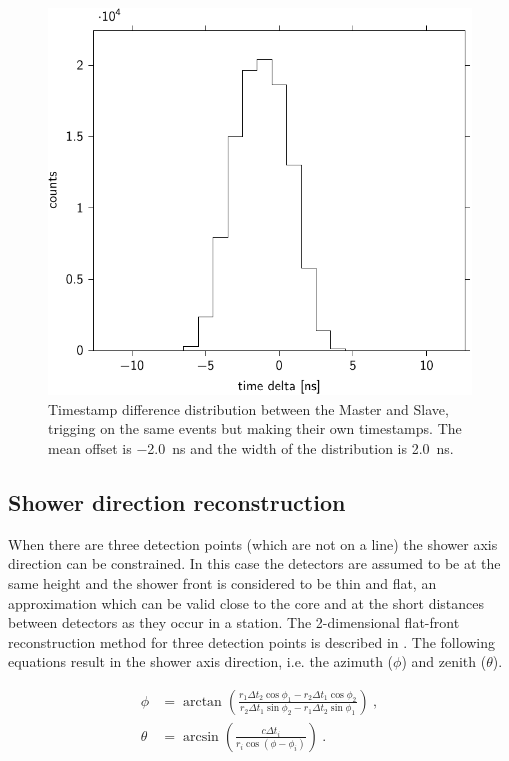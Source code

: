 \begin{figure}
    \centering
    \includegraphics{plots/station/time_delta_501}
    \caption{Timestamp difference distribution between the Master and Slave, trigging on the same events but making their own timestamps. The mean offset is \SI{-2.0}{\ns} and the width of the distribution is \SI{2.0}{\ns}.}
    \label{fig:time_delta_501}
\end{figure}


\subsection{Shower direction reconstruction}

When there are three detection points (which are not on a line) the shower axis direction can be constrained. In this case the detectors are assumed to be at the same height and the shower front is considered to be thin and flat, an approximation which can be valid close to the core and at the short distances between detectors as they occur in a station. The 2-dimensional flat-front reconstruction method for three detection points is described in \cite{fokkema2012hisparc}. The following equations result in the shower axis direction, i.e. the azimuth ($\phi$) and zenith ($\theta$).

\begin{equation}
    \label{eq:direction-2dflat}
    \begin{split}
        \phi &= \arctan \left(\frac{r_1 \Delta t_2 \cos \phi_1 - r_2 \Delta t_1 \cos \phi_2}{r_2 \Delta t_1 \sin \phi_2 - r_1 \Delta t_2 \sin \phi_1} \right) \ , \\
        \theta &= \arcsin \left(\frac{c \Delta t_i}{r_i \cos(\phi - \phi_i)} \right) \ .
    \end{split}
\end{equation}

